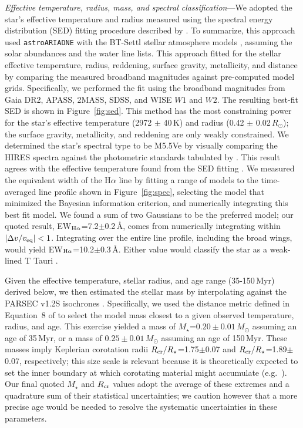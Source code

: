 \documentclass{nature3}
\begin{document}
\begin{methods}
{\it Effective temperature, radius, mass, and spectral
classification}---We adopted the star's effective temperature and
radius measured using the spectral energy distribution (SED) fitting
procedure described by \cite{Bouma2024}.  To summarize, this approach
used \texttt{astroARIADNE} \cite{Vines2022} with the BT-Settl stellar
atmosphere models \cite{Allard2012}, assuming the \cite{Asplund2009}
solar abundances and the \cite{Barber2006} water line lists.  This
approach fitted for the stellar effective temperature, radius,
reddening, surface gravity, metallicity, and distance by comparing the
measured broadband magnitudes against pre-computed model grids.
Specifically, we performed the fit using the broadband magnitudes from
Gaia DR2, APASS, 2MASS, SDSS, and WISE $W1$ and $W2$.  The resulting
best-fit SED is shown in Figure~\ref{fig:sed}.  This method has the
most constraining power for the star's effective temperature (2972
$\pm$ 40\,K) and radius (0.42 $\pm$ 0.02\,$R_\odot$); the surface
gravity, metallicity, and reddening are only weakly constrained.  We
determined the star's spectral type to be M5.5Ve by visually comparing
the HIRES spectra against the photometric standards tabulated by
\cite{Bochanski2007}.   This result agrees with the effective
temperature found from the SED fitting \cite{Pecaut2013}.  We measured
the equivalent width of the H$\alpha$ line by fitting a range of
models to the time-averaged line profile shown in
Figure~\ref{fig:spec}, selecting the model that minimized the Bayesian
information criterion, and numerically integrating this best fit model.  
We found a sum of two Gaussians to be the preferred model; our quoted
result, EW$_{{\rm H}\alpha}$=7.2$\pm$0.2\,\AA, comes from numerically
integrating within $|\Delta v/v_{\rm eq}|<1$.  Integrating over the
entire line profile, including the broad wings, would yield EW$_{{\rm
H}\alpha}$=10.2$\pm$0.3\,\AA. Either value would classify the star as
a weak-lined T Tauri \cite{Briceno2019}.

Given the effective temperature, stellar radius, and age range
(35-150\,Myr) derived below, we then estimated the stellar mass by
interpolating against the PARSEC v1.2S isochrones \cite{Chen2014}.
Specifically, we used the distance metric defined in Equation~8 of
\cite{Bouma2024} to select the model mass closest to a given observed
temperature, radius, and age.  This exercise yielded a mass of
$M_\star$=$0.20\pm0.01$\,$M_\odot$ assuming an age of 35\,Myr, or a
mass of $0.25\pm0.01$\,$M_\odot$ assuming an age of 150\,Myr.  These
masses imply Keplerian corotation radii $R_{\rm
cr}/R_\star$=1.75$\pm$0.07 and $R_{\rm cr}/R_\star$=1.89$\pm$0.07,
respectively; this size scale is relevant because it is theoretically
expected to set the inner boundary at which corotating material might
accumulate (e.g.~\cite{Townsend2005,Daley-Yates2024}).  Our final
quoted $M_\star$ and $R_{\rm cr}$ values adopt the average of these
extremes and a quadrature sum of their statistical uncertainties; we
caution however that a more precise age would be needed to resolve the
systematic uncertainties in these parameters.



\end{methods}
\end{document}
